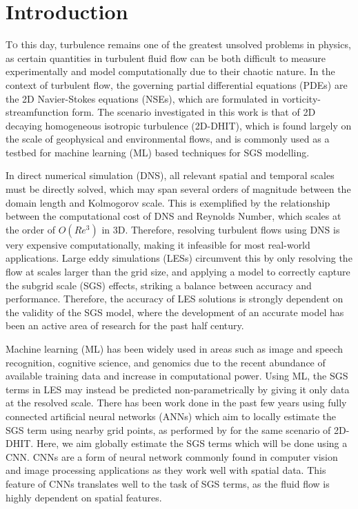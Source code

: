 \documentclass[conf]{new-aiaa}
\begin{document}
\section{Introduction}
\lettrine{T}{o} this day, turbulence remains one of the greatest unsolved problems in physics, as certain quantities in turbulent fluid flow can be both difficult to measure experimentally and model computationally due to their chaotic nature. In the context of turbulent flow, the governing partial differential equations (PDEs) are the 2D Navier-Stokes equations (NSEs), which are formulated in vorticity-streamfunction form. The scenario investigated in this work is that of 2D decaying homogeneous isotropic turbulence (2D-DHIT), which is found largely on the scale of geophysical and environmental flows, and is commonly used as a testbed for machine learning (ML) based techniques for SGS modelling\cite{xie2019artificial,2022_LES_CNN,TABELING20021,vallis2017atmospheric}.
\par 
In direct numerical simulation (DNS), all relevant spatial and temporal scales must be directly solved\cite{moin1998direct}, which may span several orders of magnitude between the domain length and Kolmogorov scale. This is exemplified by the relationship between the computational cost of DNS and Reynolds Number, which scales at the order of $O(Re^{3})$ in 3D\cite{DNS1970}. Therefore, resolving turbulent flows using DNS is very expensive computationally, making it infeasible for most real-world applications. Large eddy simulations (LESs) circumvent this by only resolving the flow at scales larger than the grid size, and applying a model to correctly capture the subgrid scale (SGS) effects\cite{pope2000turbulent}, striking a balance between accuracy and performance. Therefore, the accuracy of LES solutions is strongly dependent on the validity of the SGS model, where the development of an accurate model has been an active area of research for the past half century. 
\par
Machine learning (ML) has been widely used in areas such as image and speech recognition, cognitive science, and genomics due to the recent abundance of available training data and increase in computational power\cite{Raissi_part1}.
Using ML, the SGS terms in LES may instead be predicted non-parametrically by giving it only data at the resolved scale. There has been work done in the past few years using fully connected artificial neural networks (ANNs) which aim to locally estimate the SGS term using nearby grid points, as performed by \citeauthor{maulik2019subgrid} \cite{maulik2019subgrid} for the same scenario of 2D-DHIT. Here, we aim globally estimate the SGS terms which will be done using a CNN.
CNNs are a form of neural network commonly found in computer vision and image processing applications as they work well with spatial data. This feature of CNNs translates well to the task of SGS terms, as the fluid flow is highly dependent on spatial features. 
\end{document}
